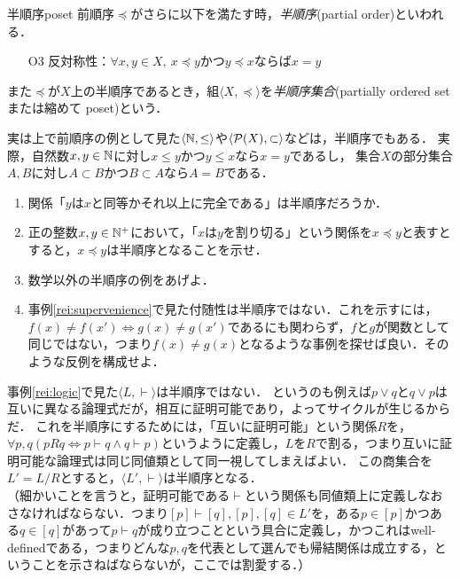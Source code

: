 \documentclass[dvipdfmx,11pt,a4paper]{jsarticle}
\begin{document}
\begin{dfn}{半順序}{poset}
前順序$\preceq$がさらに以下を満たす時，\emph{半順序}(partial order)といわれる．
\begin{itemize}
 \item[O3] 反対称性：$\forall x, y \in X, \ x \preceq y$かつ$y \preceq x$ならば$x = y$
\end{itemize}
また$\preceq$が$X$上の半順序であるとき，組$\langle X, \preceq \rangle$を\emph{半順序集合}(partially ordered set または縮めて poset)という．
\end{dfn}

実は上で前順序の例として見た$\langle \mathbb{N}, \leq \rangle$や$\langle \mathcal{P}(X), \subset \rangle$などは，半順序でもある．
実際，自然数$x, y \in \mathbb{N}$に対し$x \leq y$かつ$y \leq x$なら$x=y$であるし，
集合$X$の部分集合$A, B$に対し$A \subset B$かつ$B \subset A$なら$A=B$である．

\begin{renshu}{}{}
\begin{enumerate}
 \item 関係「$y$は$x$と同等かそれ以上に完全である」は半順序だろうか．
 \item 正の整数$x, y \in \mathbb{N}^+$において，「$x$は$y$を割り切る」という関係を$x \preceq y$と表すとすると，$x \preceq y$は半順序となることを示せ．
 \item 数学以外の半順序の例をあげよ．
 \item 事例\ref{rei:supervenience}で見た付随性は半順序ではない．これを示すには，$f(x) \neq f(x') \iff g(x) \neq g(x')$であるにも関わらず，$f$と$g$が関数として同じではない，つまり$f(x) \neq g(x)$となるような事例を探せば良い．そのような反例を構成せよ．
\end{enumerate}
\end{renshu}

事例\ref{rei:logic}で見た$\langle L, \vdash \rangle$は半順序ではない．
というのも例えば$p \vee q$と$q \vee p$は互いに異なる論理式だが，相互に証明可能であり，よってサイクルが生じるからだ．
これを半順序にするためには，「互いに証明可能」という関係$R$を，$\forall p, q (pRq \iff p \vdash q \wedge q \vdash p)$というように定義し，$L$を$R$で割る，つまり互いに証明可能な論理式は同じ同値類として同一視してしまえばよい．
この商集合を$L' = L/R$とすると，$\langle L', \vdash \rangle$は半順序となる．\\
（細かいことを言うと，証明可能である$\vdash$という関係も同値類上に定義しなおさなければならない．つまり$[p]\vdash[q], [p], [q] \in L'$を，ある$p \in [p]$かつある$q \in [q]$があって$p \vdash q$が成り立つことという具合に定義し，かつこれはwell-definedである，つまりどんな$p, q$を代表として選んでも帰結関係は成立する，ということを示さねばならないが，ここでは割愛する．）
\end{document}
